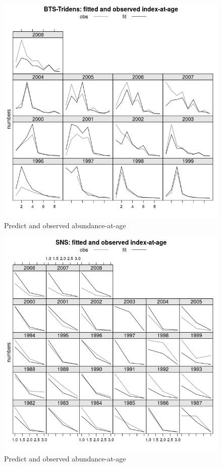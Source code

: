 \documentclass[a4paper,english,10pt]{article}\usepackage[]{graphicx}\usepackage[]{color}
\makeatletter
\def\maxwidth{ %
  \ifdim\Gin@nat@width>\linewidth
    \linewidth
  \else
    \Gin@nat@width
  \fi
}
\newenvironment{knitrout}{}{} %
\makeatother
\begin{document}
\begin{knitrout}
\begin{figure}[H]
{\centering \includegraphics[width=\maxwidth]{figure/idxplt-2} 

}

\caption[Predict and observed abundance-at-age]{Predict and observed abundance-at-age}\label{fig:idxplt2}
\end{figure}

\begin{figure}[H]

{\centering \includegraphics[width=\maxwidth]{figure/idxplt-3} 

}

\caption[Predict and observed abundance-at-age]{Predict and observed abundance-at-age}\label{fig:idxplt3}
\end{figure}


\end{knitrout}
\end{document}
